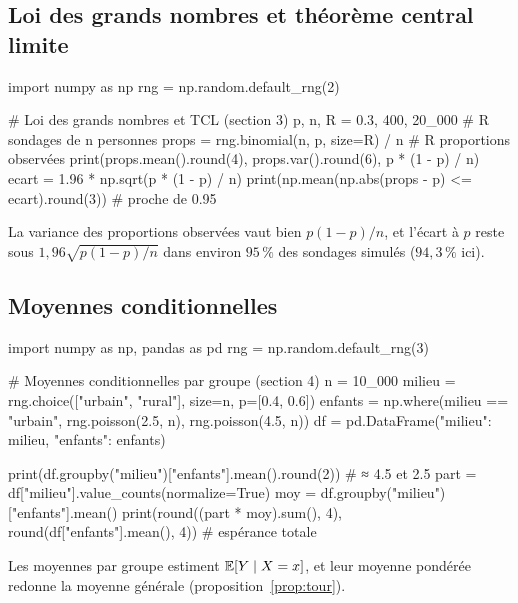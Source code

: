 \subsection{Loi des grands nombres et théorème central limite}
\begin{python}
import numpy as np
rng = np.random.default_rng(2)

# Loi des grands nombres et TCL (section 3)
p, n, R = 0.3, 400, 20_000                     # R sondages de n personnes
props = rng.binomial(n, p, size=R) / n         # R proportions observées
print(props.mean().round(4), props.var().round(6), p * (1 - p) / n)
ecart = 1.96 * np.sqrt(p * (1 - p) / n)
print(np.mean(np.abs(props - p) <= ecart).round(3))   # proche de 0.95
\end{python}
La variance des proportions observées vaut bien $p(1-p)/n$, et l'écart à $p$ reste sous $1{,}96\sqrt{p(1-p)/n}$ dans environ $95\,\%$ des sondages simulés ($94{,}3\,\%$ ici).

\subsection{Moyennes conditionnelles}
\begin{python}
import numpy as np, pandas as pd
rng = np.random.default_rng(3)

# Moyennes conditionnelles par groupe (section 4)
n = 10_000
milieu = rng.choice(["urbain", "rural"], size=n, p=[0.4, 0.6])
enfants = np.where(milieu == "urbain", rng.poisson(2.5, n), rng.poisson(4.5, n))
df = pd.DataFrame({"milieu": milieu, "enfants": enfants})

print(df.groupby("milieu")["enfants"].mean().round(2))   # ≈ 4.5 et 2.5
part = df["milieu"].value_counts(normalize=True)
moy = df.groupby("milieu")["enfants"].mean()
print(round((part * moy).sum(), 4), round(df["enfants"].mean(), 4))  # espérance totale
\end{python}
Les moyennes par groupe estiment $\mathbb{E}[Y\mid X=x]$, et leur moyenne pondérée redonne la moyenne générale (proposition~\ref{prop:tour}).
